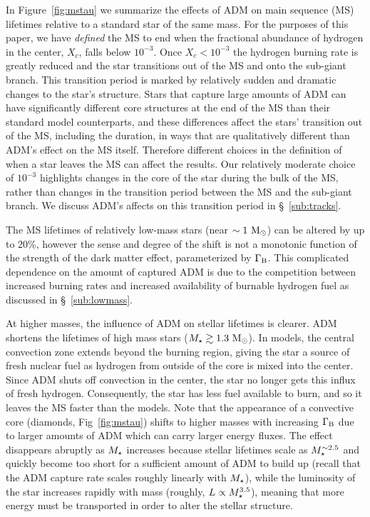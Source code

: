 \documentclass[useAMS,usenatbib]{mnras}
\begin{document}
In Figure~\ref{fig:mstau} we summarize the effects of ADM on main sequence (MS) lifetimes relative to a standard \nodm star of the same mass. For the purposes of this paper, we have {\em defined} the MS to end when the fractional abundance of hydrogen in the center, $X_c$, falls below $10^{-3}$. Once $X_c < 10^{-3}$ the hydrogen burning rate is greatly reduced and the star transitions out of the MS and onto the sub-giant branch. This transition period is marked by relatively sudden and dramatic changes to the star's structure. Stars that capture large amounts of ADM can have significantly different core structures at the end of the MS than their standard model counterparts, and these differences affect the stars' transition out of the MS, including the duration, in ways that are qualitatively different than ADM's effect on the MS itself. Therefore different choices in the definition of when a star leaves the MS can affect the results. Our relatively moderate choice of $10^{-3}$ highlights changes in the core of the star during the bulk of the MS, rather than changes in the transition period between the MS and the sub-giant branch. We discuss ADM's affects on this transition period in \S~\ref{sub:tracks}.

The MS lifetimes of relatively 
low-mass stars (near $\sim 1 \ \mathrm{M}_{\odot}$) can be altered by up to 20\%, however the sense and degree of the shift is not a monotonic function of the strength of the 
dark matter effect, parameterized by $\Gamma_\mathrm{B}$. This complicated dependence on the amount of 
captured ADM is due to the competition between increased burning rates and increased 
availability of burnable hydrogen fuel as discussed in \S~\ref{sub:lowmass}. 


At higher masses, the influence of ADM on stellar lifetimes is clearer. 
ADM shortens the lifetimes of high mass stars ($M_{\star} \gtrsim 1.3 \ \mathrm{M}_{\odot}$). 
In \nodm models, the central convection zone extends beyond the burning region, 
giving the star a source of fresh nuclear fuel as hydrogen from outside 
of the core is mixed into the center. 
Since ADM shuts off convection in the center, 
the star no longer gets this influx of fresh hydrogen. 
Consequently, the star has less fuel available to burn, 
and so it leaves the MS faster than the \nodm models. 
Note that the appearance of a convective core (diamonds, Fig~\ref{fig:mstau}) shifts 
to higher masses with increasing $\Gamma_\mathrm{B}$ 
due to larger amounts of ADM which can carry larger energy fluxes. 
The effect disappears abruptly as $M_{\star}$ increases because stellar 
lifetimes scale as $M_{\star}^{\sim 2.5}$ and 
quickly become too short for a sufficient amount of 
ADM to build up
(recall that the ADM capture rate scales roughly linearly with $M_{\star}$), 
while the luminosity of the star increases rapidly with mass 
(roughly, $L \propto M_{\star}^{3.5}$), 
meaning that more energy must be transported 
in order to alter the stellar structure.
\end{document}
